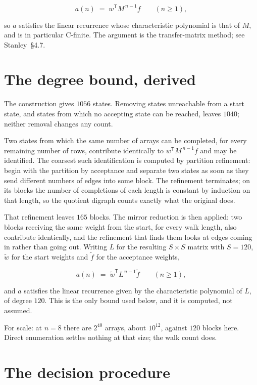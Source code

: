 \documentclass[11pt]{article}
\theoremstyle{definition}
\begin{document}
\[a(n) \;=\; w^{\mathsf T} M^{\,n-1} f \qquad (n \ge 1),\]

so $a$ satisfies the linear recurrence whose characteristic polynomial is that of $M$, and is in particular C-finite. The argument is the transfer-matrix method; see Stanley~\S4.7.

\section{The degree bound, derived}

The construction gives $1056$ states. Removing states unreachable from a start state, and states from which no accepting state can be reached, leaves $1040$; neither removal changes any count.

Two states from which the same number of arrays can be completed, for every remaining number of rows, contribute identically to $w^{\mathsf T}M^{\,n-1}f$ and may be identified. The coarsest such identification is computed by partition refinement: begin with the partition by acceptance and separate two states as soon as they send different numbers of edges into some block. The refinement terminates; on its blocks the number of completions of each length is constant by induction on that length, so the quotient digraph counts exactly what the original does.

That refinement leaves $165$ blocks. The mirror reduction is then applied: two blocks receiving the same weight from the start, for every walk length, also contribute identically, and the refinement that finds them looks at edges coming in rather than going out. Writing $L$ for the resulting $S \times S$ matrix with $S = 120$, $\tilde w$ for the start weights and $\tilde f$ for the acceptance weights,

\[a(n) \;=\; \tilde w^{\mathsf T} L^{\,n-1} \tilde f \qquad (n \ge 1),\]

and $a$ satisfies the linear recurrence given by the characteristic polynomial of $L$, of degree $120$. This is the only bound used below, and it is computed, not assumed.

For scale: at $n = 8$ there are $2^{40}$ arrays, about $10^{12}$, against $120$ blocks here. Direct enumeration settles nothing at that size; the walk count does.

\section{The decision procedure}
\end{document}
